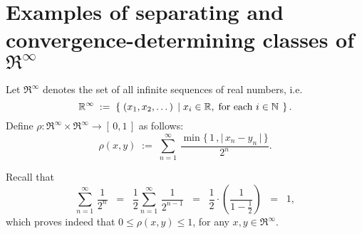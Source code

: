 

\section{Examples of separating and convergence-determining classes of $\Re^{\infty}$}
\setcounter{theorem}{0}
\setcounter{equation}{0}

\renewcommand{\theenumi}{\roman{enumi}}
\renewcommand{\labelenumi}{\textnormal{(\theenumi)}$\;\;$}

\begin{definition}
\label{RInfinityMetricSpace}
\mbox{}\vskip 0.1cm
\noindent
Let $\Re^{\infty}$ denotes the set of all infinite sequences of real numbers, i.e.
\begin{equation*}
\mathbb{R}^{\infty}
\; := \;
\left\{\;
(x_{1},x_{2},\ldots\,)
\;\left\vert\;
x_{i} \in \mathbb{R},\;\textnormal{for each $i \in \mathbb{N}$}
\right.
\;\right\}.
\end{equation*}
Define $\rho : \Re^{\infty} \times \Re^{\infty} \longrightarrow [\,0,1\,]$ as follows:
\begin{equation*}
\rho(x,y)
\; := \;
\sum_{n=1}^{\infty}\,\dfrac{\min\{\,1\,,\vert\,x_{n}-y_{n}\,\vert\,\}}{2^{n}}.
\end{equation*}
\end{definition}

\begin{remark}
Recall that
\begin{equation*}
\sum_{n=1}^{\infty}\,\dfrac{1}{2^{n}}
\;\;=\;\; \dfrac{1}{2} \sum_{n=1}^{\infty}\,\dfrac{1}{2^{n-1}}
\;\;=\;\; \dfrac{1}{2}\cdot\left(\dfrac{1}{1 - \frac{1}{2}}\right)
\;\;=\;\; 1,
\end{equation*}
which proves indeed that $0 \leq \rho(x,y) \leq 1$, for any $x, y \in \Re^{\infty}$.
\end{remark}

